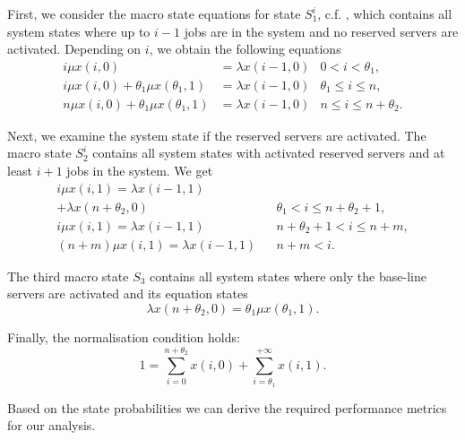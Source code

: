 First,  we consider the macro state equations for state \(S_1^i\), c.f. , which contains all system states where up to \(i-1\) jobs are in the system and no reserved servers are activated.
Depending on \(i\), we obtain the following equations
\begin{align}
i\mu x(i,0) &= \lambda x(i-1, 0) & 0<i<\theta_1,\label{eq:cloud:data_centers:modeling:energy_efficient:S1_1}\\
i\mu x(i,0) + \theta_1 \mu x(\theta_1,1) &= \lambda x(i-1,0) & \theta_1\leq i\leq n,\label{eq:cloud:data_centers:modeling:energy_efficient:S1_2}\\
n\mu x(i,0) + \theta_1 \mu x(\theta_1,1) &= \lambda x(i-1,0) & n\leq i\leq n+\theta_2.\label{eq:cloud:data_centers:modeling:energy_efficient:S1_3}
\end{align}

Next, we examine the system state if the reserved servers are activated.
The macro state \(S_2^i\) contains all system states with activated reserved servers and at least \(i+1\) jobs in the system.
We get
\begin{align}
i\mu x(i,1) = \lambda x(i-1,1)\nonumber\\
 + \lambda x(n+\theta_2,0) && \theta_1<i\leq n+\theta_2+1,\label{eq:cloud:data_centers:modeling:energy_efficient:S2_1}\\
 i\mu x(i,1) = \lambda  x(i-1,1) && n+\theta_2+1<i\leq n+m,\label{eq:cloud:data_centers:modeling:energy_efficient:S2_2}\\
 (n+m)\mu x(i,1) =\lambda x(i-1,1) && n+m<i.\label{eq:cloud:data_centers:modeling:energy_efficient:S2_3}
\end{align}

The third macro state \(S_3\) contains all system states where only the base-line servers are activated and its equation states
\begin{equation}
\lambda x(n+\theta_2,0) = \theta_1\mu x(\theta_1,1)\label{eq:cloud:data_centers:modeling:energy_efficient:S3}.
\end{equation}

Finally, the normalisation condition holds:
\begin{equation}
1=\sum_{i=0}^{n+\theta_2} x(i,0)+\sum_{i=\theta_1}^{+\infty}x(i,1).\label{eq:cloud:data_centers:modeling:normative}
\end{equation}

Based on the state probabilities we can derive the required performance metrics for our analysis.

